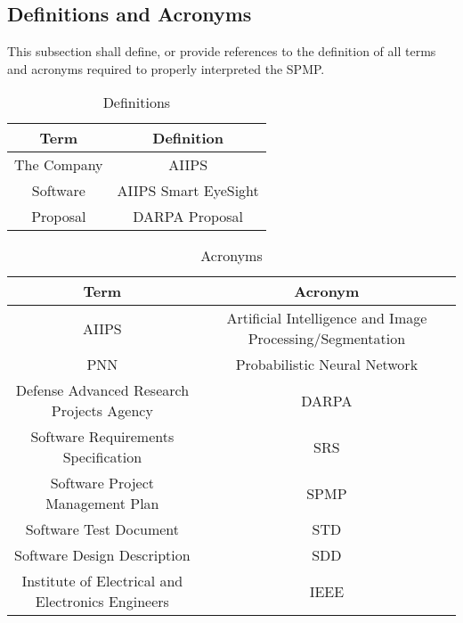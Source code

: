\documentclass[12pt]{article}
\begin{document}
\subsection{Definitions and Acronyms}
This subsection shall define, or provide references to the definition of all terms and acronyms required to properly interpreted the SPMP.
\begin{table}[H]\centering
\begin{tabular}{|c|c|}
  \hline
  Term & Definition \\
   \hline
   The Company & AIIPS \\
   \hline
   Software & AIIPS Smart EyeSight\\
   \hline
   Proposal & DARPA Proposal\\
   \hline
\end{tabular}
\caption{Definitions}
\end{table}

\begin{table}[H]\centering
\begin{tabular}{|c|c|}
  \hline
  Term & Acronym \\
   \hline
   AIIPS & Artificial Intelligence and Image Processing/Segmentation   \\
    \hline
    PNN & Probabilistic Neural Network \\
    \hline
  Defense Advanced Research Projects Agency  & DARPA \\
   \hline
  Software Requirements Specification & SRS \\
   \hline
    Software Project Management Plan & SPMP \\
   \hline
     Software Test Document & STD \\
   \hline
     Software Design Description & SDD \\
     \hline
     Institute of Electrical and Electronics Engineers & IEEE\\
   \hline
\end{tabular}
\caption{Acronyms}
\end{table}
\end{document}
